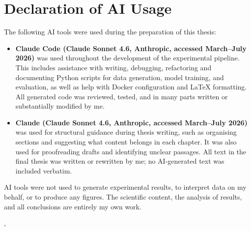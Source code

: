 \thispagestyle{empty}
\chapter*{Declaration of AI Usage}

The following AI tools were used during the preparation of this thesis:

\begin{itemize}
  \item \textbf{Claude Code (Claude Sonnet 4.6, Anthropic, accessed March--July 2026)} was used
        throughout the development of the experimental pipeline.
        This includes assistance with writing, debugging, refactoring and documenting Python scripts for
        data generation, model training, and evaluation, as well as help with
        Docker configuration and \LaTeX{} formatting.
        All generated code was reviewed, tested, and in many parts written or substantially
        modified by me.

  \item \textbf{Claude (Claude Sonnet 4.6, Anthropic, accessed March--July 2026)} was used
        for structural guidance during thesis writing, such as organising sections and
        suggesting what content belongs in each chapter.
        It was also used for proofreading drafts and identifying unclear passages.
        All text in the final thesis was written or rewritten by me;
        no AI-generated text was included verbatim.
\end{itemize}

AI tools were not used to generate experimental results, to interpret data on my behalf, or to
produce any figures. The scientific content, the analysis of results, and all conclusions are
entirely my own work.

\vspace{15mm}
\noindent
\getSubmissionLocation{}, \getSubmissionDate{} \hspace{\fill} \getAuthor{}

\cleardoublepage{}
